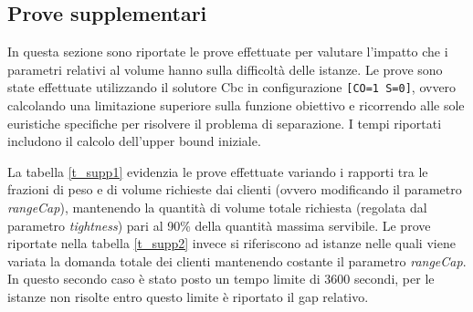 \documentclass[11pt,oneside,a4paper]{article}
\begin{document}
\subsection{Prove supplementari}

In questa sezione sono riportate le prove effettuate per valutare l'impatto che i parametri relativi al
volume hanno sulla difficoltà delle istanze. Le prove sono state effettuate utilizzando il solutore Cbc in
configurazione \texttt{[CO=1 S=0]}, ovvero calcolando una limitazione superiore sulla funzione obiettivo e
ricorrendo alle sole euristiche specifiche per risolvere il problema di separazione. I tempi riportati
includono il calcolo dell'upper bound iniziale.

La tabella \ref{t_supp1} evidenzia le prove effettuate variando i rapporti tra le frazioni di peso e di
volume richieste dai clienti (ovvero modificando il parametro \emph{rangeCap}), mantenendo la quantità di
volume totale richiesta (regolata dal parametro \emph{tightness}) pari al 90\% della quantità massima
servibile. Le prove riportate nella tabella \ref{t_supp2} invece si riferiscono ad istanze nelle quali viene
variata la domanda totale dei clienti mantenendo costante il parametro \emph{rangeCap}. In questo secondo
caso è stato posto un tempo limite di 3600 secondi, per le istanze non risolte entro questo limite è
riportato il gap relativo.
\end{document}
